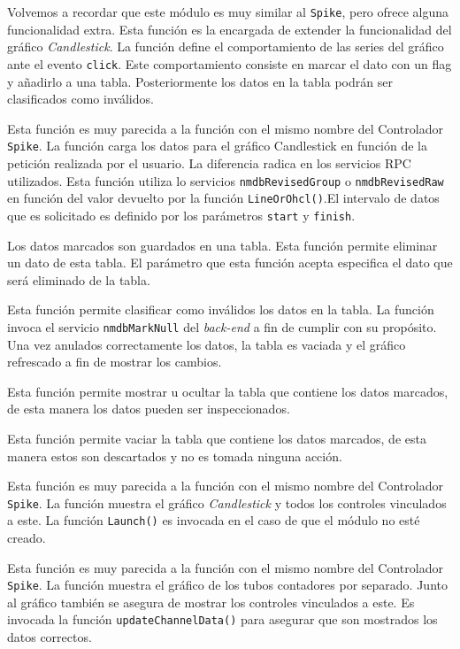 \begin{description}[style=unboxed,leftmargin=0cm]
			\item[\texttt{extendCandleChart()}]
				Volvemos a recordar que este módulo es muy similar al \texttt{Spike}, pero ofrece alguna funcionalidad extra. Esta
				función es la encargada de extender la funcionalidad del gráfico \emph{Candlestick}. La función define el
				comportamiento de las series del gráfico ante el evento \texttt{click}. Este comportamiento consiste en marcar el dato
				con un flag y añadirlo a una tabla. Posteriormente los datos en la tabla podrán ser clasificados como inválidos. 
			\item[\texttt{updateCandleData(start, finish)}]
				Esta función es muy parecida a la función con el mismo nombre del Controlador \texttt{Spike}. La función carga los
				datos para el gráfico Candlestick en función de la petición realizada por el usuario. La diferencia radica en los
				servicios RPC utilizados. Esta función utiliza lo servicios \texttt{nmdbRevisedGroup} o \texttt{nmdbRevisedRaw} en
				función del valor devuelto por la función \texttt{LineOrOhcl()}.El intervalo de datos que es solicitado es definido
				por los parámetros \texttt{start} y \texttt{finish}.
			\item[\texttt{removeFromGrid(rowIndex)}]
				Los datos marcados son guardados en una tabla. Esta función permite eliminar un dato de esta tabla. El parámetro que
				esta función acepta especifica el dato que será eliminado de la tabla. 
			\item[\texttt{submitGrid()}]
				Esta función permite clasificar como inválidos los datos en la tabla. La función invoca el servicio
				\texttt{nmdbMarkNull} del \emph{back-end} a fin de cumplir con su propósito. Una vez anulados correctamente los datos,
				la tabla es vaciada y el gráfico refrescado a fin de mostrar los cambios.
			\item[\texttt{showHideGrid()}]
				Esta función permite mostrar u ocultar la tabla que contiene los datos marcados, de esta manera los datos pueden ser
				inspeccionados.
			\item[\texttt{clearGrid()}]
				Esta función permite vaciar la tabla que contiene los datos marcados, de esta manera estos son descartados y no es
				tomada ninguna acción.
			\item[\texttt{showCandle()}]
				Esta función es muy parecida a la función con el mismo nombre del Controlador \texttt{Spike}. La función muestra el
				gráfico \emph{Candlestick} y todos los controles vinculados a este. La función \texttt{Launch()} es invocada en el
				caso de que el módulo no esté creado.
			\item[\texttt{showChannel()}]
				Esta función es muy parecida a la función con el mismo nombre del Controlador \texttt{Spike}. La función muestra el
				gráfico de los tubos contadores por separado. Junto al gráfico también se asegura de mostrar los controles vinculados
				a este. Es invocada la función \texttt{updateChannelData()} para asegurar que son mostrados los datos correctos.
		\end{description}
